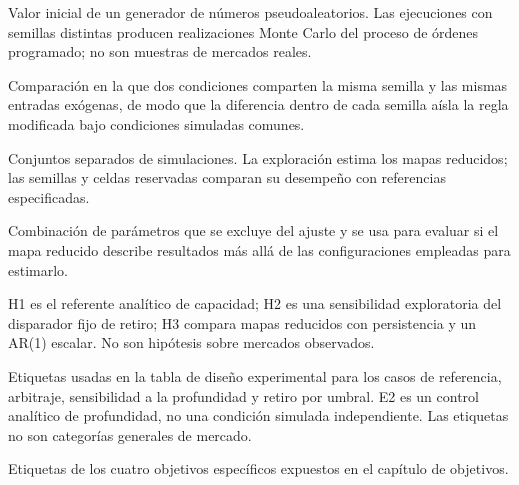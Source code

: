 \begin{description}[style=unboxed,leftmargin=0pt,labelwidth=0pt,labelsep=0.5em,itemsep=0.1em]
  \item[Semilla:] Valor inicial de un generador de números pseudoaleatorios. Las ejecuciones con semillas distintas producen realizaciones Monte Carlo del proceso de órdenes programado; no son muestras de mercados reales.
  \item[Diseño pareado:] Comparación en la que dos condiciones comparten la misma semilla y las mismas entradas exógenas, de modo que la diferencia dentro de cada semilla aísla la regla modificada bajo condiciones simuladas comunes.
  \item[Exploración y evaluación reservada:] Conjuntos separados de simulaciones. La exploración estima los mapas reducidos; las semillas y celdas reservadas comparan su desempeño con referencias especificadas.
  \item[Configuración reservada:] Combinación de parámetros que se excluye del ajuste y se usa para evaluar si el mapa reducido describe resultados más allá de las configuraciones empleadas para estimarlo.
  \item[H1--H3:] H1 es el referente analítico de capacidad; H2 es una sensibilidad exploratoria del disparador fijo de retiro; H3 compara mapas reducidos con persistencia y un AR(1) escalar. No son hipótesis sobre mercados observados.
  \item[E0--E3:] Etiquetas usadas en la tabla de diseño experimental para los casos de referencia, arbitraje, sensibilidad a la profundidad y retiro por umbral. E2 es un control analítico de profundidad, no una condición simulada independiente. Las etiquetas no son categorías generales de mercado.
  \item[OE1--OE4:] Etiquetas de los cuatro objetivos específicos expuestos en el capítulo de objetivos.
\end{description}

